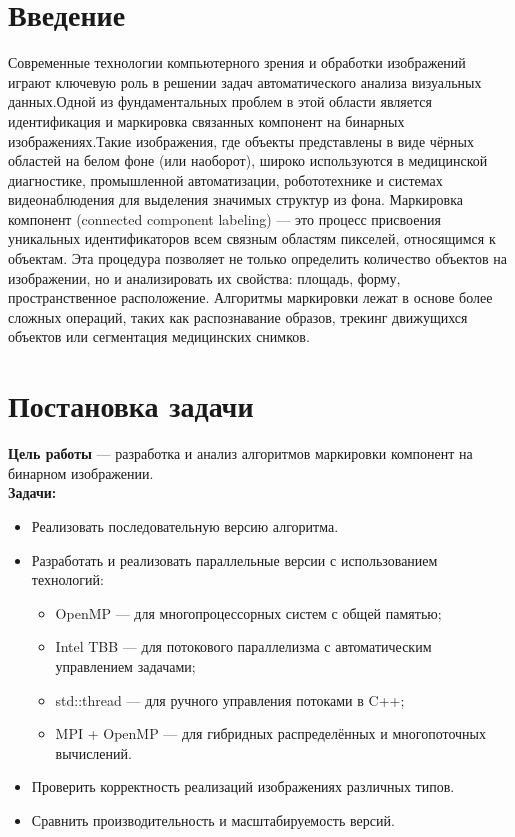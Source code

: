 \documentclass[12pt]{extarticle}
\begin{document}
\section{Введение}
\hspace*{1.25cm}Современные технологии компьютерного зрения и обработки изображений играют ключевую роль в решении задач автоматического анализа визуальных данных.Одной из фундаментальных проблем в этой области является идентификация и маркировка связанных компонент на бинарных изображениях.Такие изображения, где объекты представлены в виде чёрных областей на белом фоне (или наоборот), широко используются в медицинской диагностике, промышленной автоматизации, робототехнике и системах видеонаблюдения для выделения значимых структур из фона.
Маркировка компонент (connected component labeling) — это процесс присвоения уникальных идентификаторов всем связным областям пикселей, относящимся к объектам. Эта процедура позволяет не только определить количество объектов на изображении, но и анализировать их свойства: площадь, форму, пространственное расположение. Алгоритмы маркировки лежат в основе более сложных операций, таких как распознавание образов, трекинг движущихся объектов или сегментация медицинских снимков.

\section{Постановка задачи}

\hspace*{1.25cm}\textbf{Цель работы} — разработка и анализ алгоритмов маркировки компонент на бинарном изображении. \\[0.5cm]
\hspace*{1.25cm}\textbf{Задачи:}
\begin{itemize}
    \item Реализовать последовательную версию алгоритма.
    \item Разработать и реализовать параллельные версии с использованием технологий:
    \begin{itemize}
        \item OpenMP — для многопроцессорных систем с общей памятью;
        \item Intel TBB — для потокового параллелизма с автоматическим управлением задачами;
        \item std::thread — для ручного управления потоками в C++;
        \item MPI + OpenMP — для гибридных распределённых и многопоточных вычислений.
    \end{itemize}
    \item Проверить корректность реализаций изображениях различных типов.
    \item Сравнить производительность и масштабируемость версий.
\end{itemize}
\end{document}
